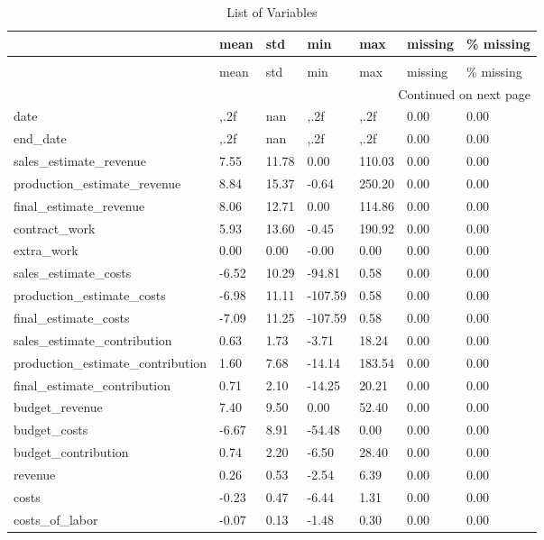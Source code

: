 \begin{landscape}\begin{longtable}[h!]{lllllll}
\caption{List of Variables} \label{eda_1} \\
\toprule
 & mean & std & min & max & missing & \% missing \\
\midrule
\endfirsthead
\caption[]{List of Variables} \\
\toprule
 & mean & std & min & max & missing & \% missing \\
\midrule
\endhead
\midrule
\multicolumn{7}{r}{Continued on next page} \\
\midrule
\endfoot
\bottomrule
\endlastfoot
date & ,.2f & nan & ,.2f & ,.2f & 0.00 & 0.00 \\
end_date & ,.2f & nan & ,.2f & ,.2f & 0.00 & 0.00 \\
sales_estimate_revenue & 7.55 & 11.78 & 0.00 & 110.03 & 0.00 & 0.00 \\
production_estimate_revenue & 8.84 & 15.37 & -0.64 & 250.20 & 0.00 & 0.00 \\
final_estimate_revenue & 8.06 & 12.71 & 0.00 & 114.86 & 0.00 & 0.00 \\
contract_work & 5.93 & 13.60 & -0.45 & 190.92 & 0.00 & 0.00 \\
extra_work & 0.00 & 0.00 & -0.00 & 0.00 & 0.00 & 0.00 \\
sales_estimate_costs & -6.52 & 10.29 & -94.81 & 0.58 & 0.00 & 0.00 \\
production_estimate_costs & -6.98 & 11.11 & -107.59 & 0.58 & 0.00 & 0.00 \\
final_estimate_costs & -7.09 & 11.25 & -107.59 & 0.58 & 0.00 & 0.00 \\
sales_estimate_contribution & 0.63 & 1.73 & -3.71 & 18.24 & 0.00 & 0.00 \\
production_estimate_contribution & 1.60 & 7.68 & -14.14 & 183.54 & 0.00 & 0.00 \\
final_estimate_contribution & 0.71 & 2.10 & -14.25 & 20.21 & 0.00 & 0.00 \\
budget_revenue & 7.40 & 9.50 & 0.00 & 52.40 & 0.00 & 0.00 \\
budget_costs & -6.67 & 8.91 & -54.48 & 0.00 & 0.00 & 0.00 \\
budget_contribution & 0.74 & 2.20 & -6.50 & 28.40 & 0.00 & 0.00 \\
revenue & 0.26 & 0.53 & -2.54 & 6.39 & 0.00 & 0.00 \\
costs & -0.23 & 0.47 & -6.44 & 1.31 & 0.00 & 0.00 \\
costs_of_labor & -0.07 & 0.13 & -1.48 & 0.30 & 0.00 & 0.00 \\

\end{longtable}
\end{landscape}
